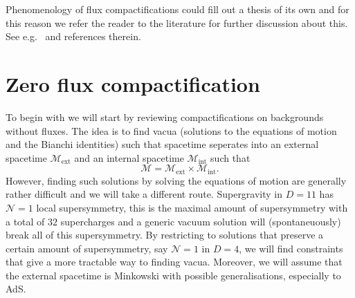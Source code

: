 Phenomenology of flux compactifications could fill out a thesis of its own and for this reason we refer the reader to the literature for further discussion about this. See e.g.\ \cite{Grana:2005jc} and references therein.

\section{Zero flux compactification\label{sec:VanishingFluxCompactification}}
To begin with we will start by reviewing compactifications on backgrounds without fluxes. The idea is to find vacua (solutions to the equations of motion and the Bianchi identities) such that spacetime seperates into an external spacetime $\mathcal{M}_{\text{ext}}$ and an internal spacetime $\mathcal{M}_{\text{int}}$ such that 
\begin{equation}
    \mathcal{M} = \mathcal{M}_{\text{ext}}\times \mathcal{M}_{\text{int}}.
\end{equation}
However, finding such solutions by solving the equations of motion are generally rather difficult and we will take a different route. Supergravity in $D=11$ has $\mathcal{N}=1$ local supersymmetry, this is the maximal amount of supersymmetry with a total of $32$ supercharges and a generic vacuum solution will (spontaneuously) break all of this supersymmetry. By restricting to solutions that preserve a certain amount of supersymmetry, say $\mathcal{N}=1$ in $D=4$, we will find constraints that give a more tractable way to finding vacua. Moreover, we will assume that the external spacetime is Minkowski with possible generalisations, especially to AdS. 

